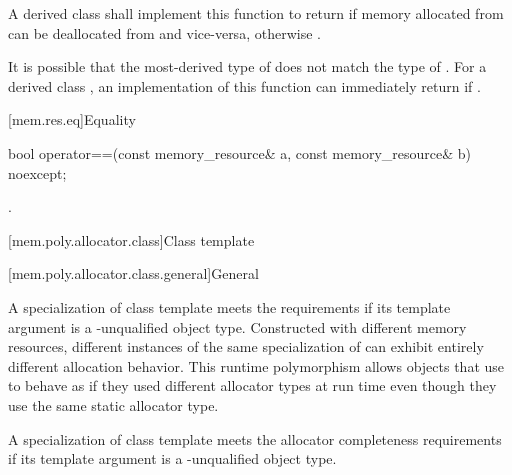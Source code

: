 \begin{itemdescr}
\pnum
\returns
A derived class shall implement this function to return  if memory allocated from  can be deallocated from  and vice-versa,
otherwise .
\begin{note}
It is possible that the most-derived type of  does not match the type of .
For a derived class , an implementation of this function
can immediately return 
if .
\end{note}
\end{itemdescr}

[mem.res.eq]{Equality}

%
\begin{itemdecl}
bool operator==(const memory_resource& a, const memory_resource& b) noexcept;
\end{itemdecl}

\begin{itemdescr}
\pnum
\returns
{}.
\end{itemdescr}

[mem.poly.allocator.class]{Class template }

[mem.poly.allocator.class.general]{General}

\pnum
A specialization of class template  meets
the  requirements
if its template argument is a \cv-unqualified object type.
Constructed with different memory resources,
different instances of the same specialization of 
can exhibit entirely different allocation behavior.
This runtime polymorphism allows objects that use 
to behave as if they used different allocator types at run time
even though they use the same static allocator type.

\pnum
A specialization of class template 
meets the allocator completeness requirements
if its template argument is a \cv-unqualified object type.

